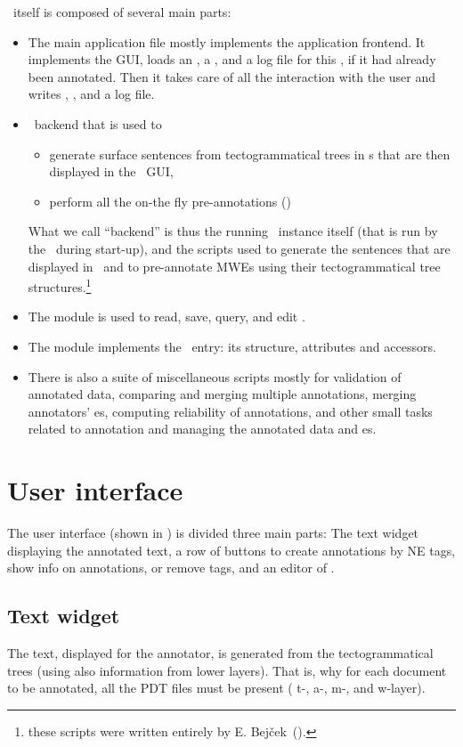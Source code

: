 \seman\ itself is composed of several main parts:
\begin{itemize}
  \item The main application file  mostly implements the application frontend. It implements the GUI, loads an \sf, a \semlex,  and a log file for this \sf, if it had already been annotated. Then it takes care of all the interaction with the user and writes \sf, \semlex, and a log file.
  \item \ntred\ backend that is used to 
	\begin{itemize}
	  \item generate surface sentences from tectogrammatical trees in \tf{}s that are then displayed in the \seman\ GUI,
	  \item perform all the on-the fly pre-annotations ()
	\end{itemize}
	What we call ``backend'' is thus the running \ntred\ instance itself (that is run by the \seman\ during start-up), and the scripts used to generate the sentences that are displayed in \seman\ and to pre-annotate MWEs using their tectogrammatical tree structures.\footnote{these scripts were written entirely by E. Bejček~(\citeyear{bejcek:2010}).}
  \item The module  is used to read, save, query, and edit \semlex.
    \item The module  implements the \semlex\ entry: its structure, attributes and accessors.
  \item There is also a suite of miscellaneous scripts mostly for validation of annotated data, comparing and merging multiple annotations, merging annotators' \semlex{}es, computing reliability of annotations, and other small tasks related to annotation and managing the annotated data and \semlex{}es.
\end{itemize}

\section{User interface}
\label{sec:seman:gui}
The user interface (shown in ) is divided three main parts: The text widget displaying the annotated text, a row of buttons to create annotations by NE tags, show info on annotations, or remove tags, and an editor of \semlex. 



\subsection{Text widget}
\label{sec:text-widget}
The text, displayed for the annotator, is generated from the tectogrammatical trees (using also information from lower layers). That is, why for each document to be annotated, all the PDT files must be present ( t-, a-, m-, and w-layer). 

